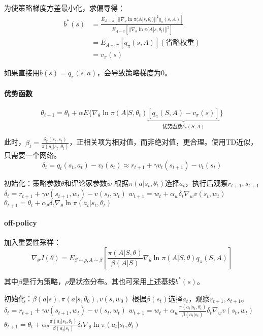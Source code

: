 \documentclass[
12pt, %
a4paper, 
oneside, %
headinclude,footinclude, %
]{scrartcl}
\begin{document}
为使策略梯度方差最小化，求偏导得：
\begin{align*}
b^*(s) &= \frac{E_{A \sim \pi}[||\nabla_\theta \ln \pi(A|s, \theta_t)||^2 q_\pi(s, A)]}{E_{A \sim \pi}[||\nabla_\theta \ln \pi(A|s, \theta_t)||^2]} \\
&= E_{A \sim \pi}[q_\pi(s, A)] (\text{省略权重}) \\
&= v_{\pi}(s)
\end{align*}

如果直接用$ b(s) = q_{\pi}(s, a) $，会导致策略梯度为$ 0 $。
\paragraph{优势函数}
$$ \theta_{t + 1} = \theta_t + \alpha E\{\nabla_\theta \ln \pi(A|S, \theta_t) \underbrace{[q_\pi(S, A) - v_{\pi}(s)]}_{\text{优势函数}\delta_{\pi}(S, A)}\} $$

此时，$ \beta_t = \frac{\delta_{\pi}(s_t, s_t)}{\pi(a_t|s_t, \theta_t)} $，正相关项为相对值，而非绝对值，更合理。使用TD近似，只需要一个网络。
$$ \delta_t = q_t(s_t, a_t) - v_t(s_t) \approx r_{t + 1} + \gamma v_t(s_{t + 1}) - v_t(s_t) $$
\begin{myalgorithm}[A2C]
\State 初始化：策略参数$ \theta $和评论家参数$ w $
\State 根据$ \pi(a|s_t, \theta_t) $选择$ a_t $，执行后观察$ r_{t + 1}, s_{t + 1} $
\State $ \delta_t = r_{t + 1} + \gamma v(s_{t + 1}, w_t) - v(s_t, w_t) $ 
\State $ w_{t + 1} = w_t + \alpha_w \delta_t \nabla_w v(s_t, w_t) $ 
\State $ \theta_{t + 1} = \theta_t + \alpha_\theta \delta_t \nabla_\theta \ln \pi(a_t|s_t, \theta_t) $ 
\EndFor
\EndFor
\end{myalgorithm}
\paragraph{off-policy}
加入重要性采样：
$$ \nabla_\theta J(\theta) = E_{S \sim \rho, A \sim \beta}[\frac{\pi(A|S, \theta)}{\beta(A|S)}\nabla_\theta \ln \pi(A|S, \theta)q_\pi(S, A)] $$

其中$ \beta $是行为策略，$ \rho $是状态分布。其也可采用上述基线$ b^*(s) $。
\begin{myalgorithm}
\State 初始化：$ \beta(a|s), \pi(a|s, \theta_0), v(s, w_0) $
\State 根据$ \beta(s_t) $选择$ a_t $，观察$ r_{t + 1}, s_{t + 1} $。
\State $ \delta_t = r_{t + 1} + \gamma v(s_{t + 1}, w_t) - v(s_t, w_t) $ 
\State $ w_{t + 1} = w_t + \alpha_w \frac{\pi(a_t|s_t, \theta_t)}{\beta(a_t|s_t)} \delta_t \nabla_w v(s_t, w_t) $ 
\State $ \theta_{t + 1} = \theta_t + \alpha_\theta \frac{\pi(a_t|s_t, \theta_t)}{\beta(a_t|s_t)} \delta_t \nabla_\theta \ln \pi(a_t|s_t, \theta_t) $ 
\EndFor
\EndFor
\end{myalgorithm}
\end{document}
